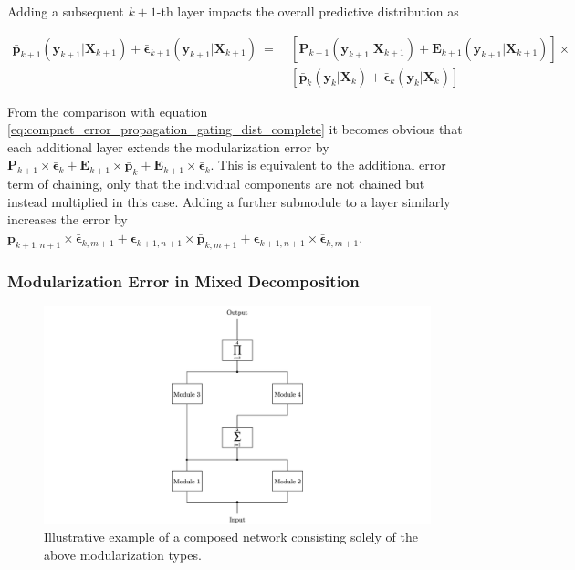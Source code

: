Adding a subsequent $k+1$-th layer impacts the overall predictive distribution as

\begin{equation}
\label{eq:compnet_error_propagation_gating_dist_additional_layer}
\begin{split}
    \bar{\textbf{p}}_{k+1}(\textbf{y}_{k+1}|\textbf{X}_{k+1})+\bar{\boldsymbol{\epsilon}}_{k+1}(\textbf{y}_{k+1}|\textbf{X}_{k+1})\ =\  &
    [\textbf{P}_{k+1}(\textbf{y}_{k+1}|\textbf{X}_{k+1})+\textbf{E}_{k+1}(\textbf{y}_{k+1}|\textbf{X}_{k+1})]\times\\
    & [\bar{\textbf{p}}_k(\textbf{y}_k|\textbf{X}_k)+\bar{\boldsymbol{\epsilon}}_k(\textbf{y}_k|\textbf{X}_k)]
\end{split}
\end{equation}

From the comparison with equation \ref{eq:compnet_error_propagation_gating_dist_complete} it becomes obvious that each additional layer extends the modularization error by $\textbf{P}_{k+1}\times\bar{\boldsymbol{\epsilon}}_k+\textbf{E}_{k+1}\times\bar{\textbf{p}}_k+\textbf{E}_{k+1}\times\bar{\boldsymbol{\epsilon}}_k$. This is equivalent to the additional error term of chaining, only that the individual components are not chained but instead multiplied in this case. Adding a further submodule to a layer similarly increases the error by $\textbf{p}_{k+1,n+1}\times\bar{\boldsymbol{\epsilon}}_{k,m+1}+\boldsymbol{\epsilon}_{k+1,n+1}\times\bar{\textbf{p}}_{k,m+1}+\boldsymbol{\epsilon}_{k+1,n+1}\times\bar{\boldsymbol{\epsilon}}_{k,m+1}$.

\subsubsection{Modularization Error in Mixed Decomposition}

\begin{figure}[htb]
    \centering
	    \includegraphics[width=\textwidth, trim=250 0 250 0, clip]{thesis/graphics/graphics/modularization_error_example.jpeg}
    \caption{Illustrative example of a composed network consisting solely of the above modularization types.}
    \label{fig:compnet_error_propagation_modularization_error_example}
\end{figure}

